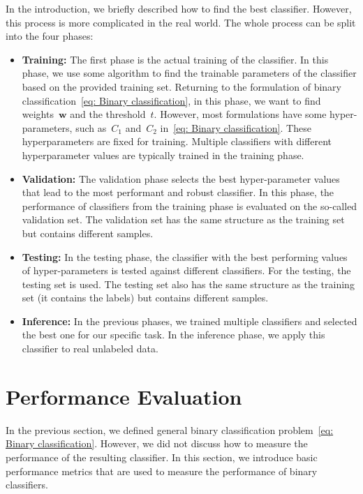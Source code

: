 In the introduction, we briefly described how to find the best classifier. However, this process is more complicated in the real world. The whole process can be split into the four phases:
\begin{itemize}
  \item \textbf{Training:} The first phase is the actual training of the classifier. In this phase, we use some algorithm to find the trainable parameters of the classifier based on the provided training set. Returning to the formulation of binary classification~\ref{eq: Binary classification}, in this phase, we want to find weights~$\bm{w}$ and the threshold~$t.$ However, most formulations have some hyper-parameters, such as~$C_1$ and~$C_2$ in~\ref{eq: Binary classification}. These hyperparameters are fixed for training. Multiple classifiers with different hyperparameter values are typically trained in the training phase.
  \item \textbf{Validation:} The validation phase selects the best hyper-parameter values that lead to the most performant and robust classifier. In this phase, the performance of classifiers from the training phase is evaluated on the so-called validation set. The validation set has the same structure as the training set but contains different samples.
  \item \textbf{Testing:} In the testing phase, the classifier with the best performing values of hyper-parameters is tested against different classifiers. For the testing, the testing set is used. The testing set also has the same structure as the training set (it contains the labels) but contains different samples.
  \item \textbf{Inference:} In the previous phases, we trained multiple classifiers and selected the best one for our specific task. In the inference phase, we apply this classifier to real unlabeled data.
\end{itemize}

\section{Performance Evaluation}\label{sec: performance evaluation}

In the previous section, we defined general binary classification problem~\eqref{eq: Binary classification}. However, we did not discuss how to measure the performance of the resulting classifier. In this section, we introduce basic performance metrics  that are used to measure the performance of binary classifiers.

